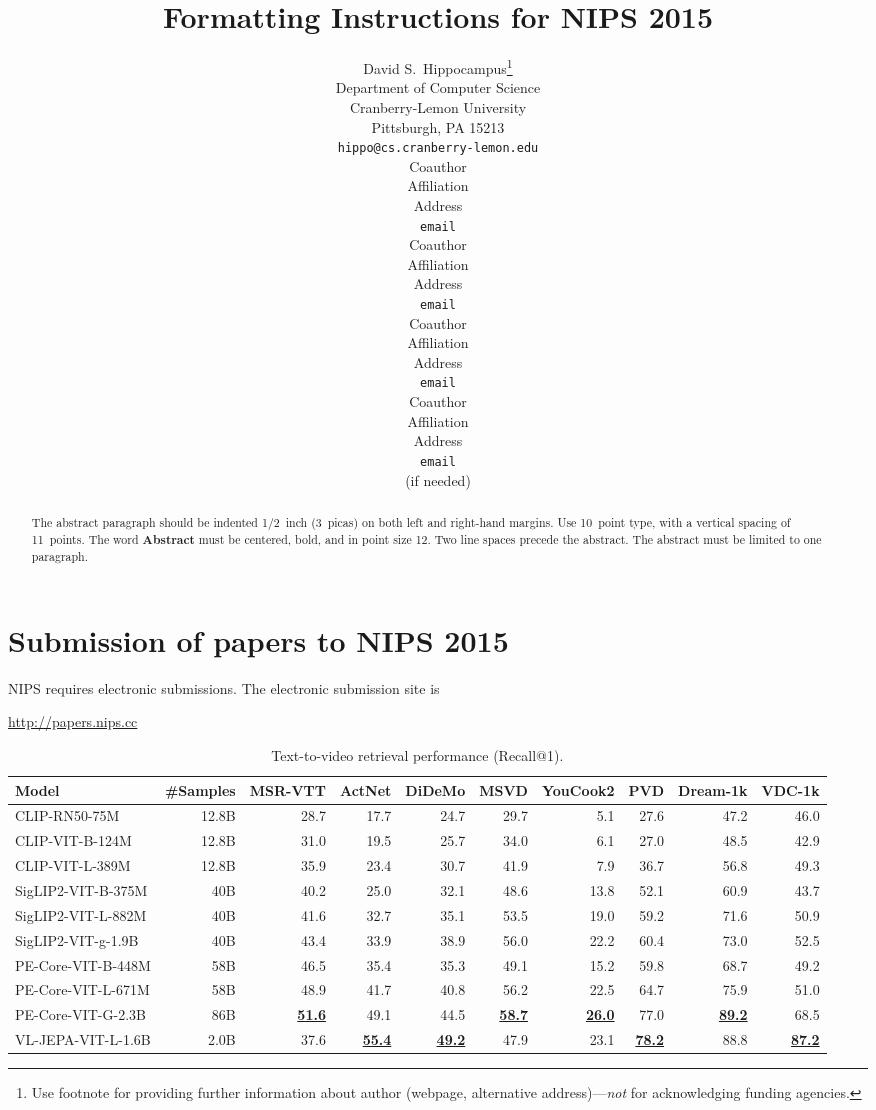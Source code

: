 \documentclass{article} %
\title{Formatting Instructions for NIPS 2015}
\author{
David S.~Hippocampus\thanks{ Use footnote for providing further information
about author (webpage, alternative address)---\emph{not} for acknowledging
funding agencies.} \\
Department of Computer Science\\
Cranberry-Lemon University\\
Pittsburgh, PA 15213 \\
\texttt{hippo@cs.cranberry-lemon.edu} \\
\And
Coauthor \\
Affiliation \\
Address \\
\texttt{email} \\
\AND
Coauthor \\
Affiliation \\
Address \\
\texttt{email} \\
\And
Coauthor \\
Affiliation \\
Address \\
\texttt{email} \\
\And
Coauthor \\
Affiliation \\
Address \\
\texttt{email} \\
(if needed)\\
}
\begin{document}
\maketitle

\begin{abstract}
The abstract paragraph should be indented 1/2~inch (3~picas) on both left and
right-hand margins. Use 10~point type, with a vertical spacing of 11~points.
The word \textbf{Abstract} must be centered, bold, and in point size 12. Two
line spaces precede the abstract. The abstract must be limited to one
paragraph.
\end{abstract}

\section{Submission of papers to NIPS 2015}

NIPS requires electronic submissions.  The electronic submission site is  
\begin{center}
   \url{http://papers.nips.cc}
\end{center}

\begin{table}[t]
\caption{Text-to-video retrieval performance (Recall@1).}
\label{tab:ret_bench}
\centering
\scriptsize
\setlength{\tabcolsep}{2.5pt}
\renewcommand{\arraystretch}{1.05}
\begin{tabular}{l r | r r r r r r r r}
\hline
\textbf{Model} & \textbf{\#Samples} & \textbf{MSR-VTT} & \textbf{ActNet} & \textbf{DiDeMo} & \textbf{MSVD} & \textbf{YouCook2} & \textbf{PVD} & \textbf{Dream-1k} & \textbf{VDC-1k} \\
\hline
CLIP-RN50-75M & 12.8B & 28.7 & 17.7 & 24.7 & 29.7 & 5.1 & 27.6 & 47.2 & 46.0 \\
CLIP-VIT-B-124M & 12.8B & 31.0 & 19.5 & 25.7 & 34.0 & 6.1 & 27.0 & 48.5 & 42.9 \\
CLIP-VIT-L-389M & 12.8B & 35.9 & 23.4 & 30.7 & 41.9 & 7.9 & 36.7 & 56.8 & 49.3 \\
\hline
SigLIP2-VIT-B-375M & 40B & 40.2 & 25.0 & 32.1 & 48.6 & 13.8 & 52.1 & 60.9 & 43.7 \\
SigLIP2-VIT-L-882M & 40B & 41.6 & 32.7 & 35.1 & 53.5 & 19.0 & 59.2 & 71.6 & 50.9 \\
SigLIP2-VIT-g-1.9B & 40B & 43.4 & 33.9 & 38.9 & 56.0 & 22.2 & 60.4 & 73.0 & 52.5 \\
\hline
PE-Core-VIT-B-448M & 58B & 46.5 & 35.4 & 35.3 & 49.1 & 15.2 & 59.8 & 68.7 & 49.2 \\
PE-Core-VIT-L-671M & 58B & 48.9 & 41.7 & 40.8 & 56.2 & 22.5 & 64.7 & 75.9 & 51.0 \\
PE-Core-VIT-G-2.3B & 86B & \underline{\textbf{51.6}} & 49.1 & 44.5 & \underline{\textbf{58.7}} & \underline{\textbf{26.0}} & 77.0 & \underline{\textbf{89.2}} & 68.5 \\
\hline
VL-JEPA-VIT-L-1.6B & 2.0B & 37.6 & \underline{\textbf{55.4}} & \underline{\textbf{49.2}} & 47.9 & 23.1 & \underline{\textbf{78.2}} & 88.8 & \underline{\textbf{87.2}} \\
\hline
\end{tabular}
\end{table}
\end{document}
